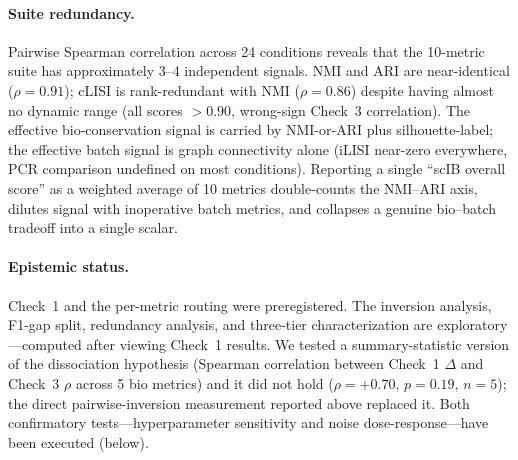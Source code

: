 \documentclass[9pt,lineno]{elife}
\begin{document}
\paragraph{Suite redundancy.} Pairwise Spearman correlation across 24 conditions reveals that the 10-metric suite has approximately 3--4 independent signals. NMI and ARI are near-identical ($\rho = 0.91$); cLISI is rank-redundant with NMI ($\rho = 0.86$) despite having almost no dynamic range (all scores $> 0.90$, wrong-sign Check~3 correlation). The effective bio-conservation signal is carried by NMI-or-ARI plus silhouette-label; the effective batch signal is graph connectivity alone (iLISI near-zero everywhere, PCR comparison undefined on most conditions). Reporting a single ``scIB overall score'' as a weighted average of 10 metrics double-counts the NMI--ARI axis, dilutes signal with inoperative batch metrics, and collapses a genuine bio--batch tradeoff into a single scalar.

\paragraph{Epistemic status.} Check~1 and the per-metric routing were preregistered. The inversion analysis, F1-gap split, redundancy analysis, and three-tier characterization are exploratory---computed after viewing Check~1 results. We tested a summary-statistic version of the dissociation hypothesis (Spearman correlation between Check~1 $\Delta$ and Check~3 $\rho$ across 5 bio metrics) and it did not hold ($\rho = +0.70$, $p = 0.19$, $n = 5$); the direct pairwise-inversion measurement reported above replaced it. Both confirmatory tests---hyperparameter sensitivity and noise dose-response---have been executed (below).
\end{document}
